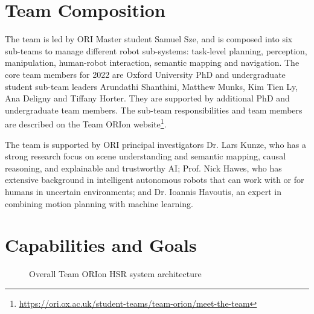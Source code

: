 \documentclass[runningheads,a4paper]{llncs}
\newcommand{\teamori}{Team ORIon}
\newcommand{\competitionyear}{2023}
\newcommand{\robocuptitleshort}{RoboCup \competitionyear}
\begin{document}
\section{Team Composition}
The team is led by ORI Master student Samuel Sze, and is composed into six sub-teams to manage different robot sub-systems: task-level planning, perception, manipulation, human-robot interaction, semantic mapping and navigation. The core team members for 2022 are Oxford University PhD and undergraduate student sub-team leaders Arundathi Shanthini, Matthew Munks, Kim Tien Ly, Ana Deligny and Tiffany Horter. They are supported by additional PhD and undergraduate team members. The sub-team responsibilities and team members are described on the \teamori{} website\footnote{\url{https://ori.ox.ac.uk/student-teams/team-orion/meet-the-team}}.

The team is supported by ORI principal investigators Dr. Lars Kunze, who has a strong research focus on scene understanding and semantic mapping, causal reasoning, and explainable and trustworthy AI; Prof. Nick Hawes, who has extensive background in intelligent autonomous robots that can work with or for humans in uncertain environments; and Dr. Ioannis Havoutis, an expert in combining motion planning with machine learning.

\section{Capabilities and Goals}


\begin{figure}[!ht]
	\centering
	\vspace{-10pt}%
	\caption{Overall Team ORIon HSR system architecture}
	\label{fig:overall}
	\vspace{-3ex}
\end{figure}
\end{document}

